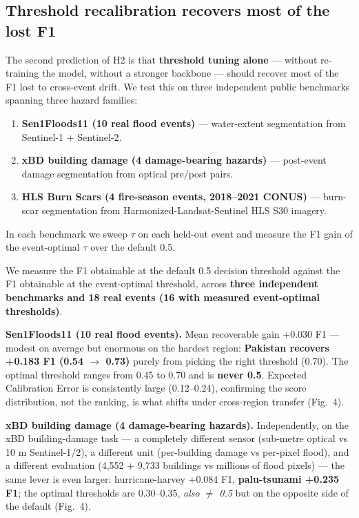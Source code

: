 \documentclass[sn-nature,lineno]{sn-jnl}
\providecommand{\tightlist}{\setlength{\itemsep}{0pt}\setlength{\parskip}{0pt}}
\theoremstyle{thmstyleone}
\theoremstyle{thmstyletwo}
\theoremstyle{thmstylethree}
\begin{document}
\subsection{Threshold recalibration recovers most of the lost F1}\label{threshold-recalibration-recovers-most-of-the-lost-f1}

The second prediction of H2 is that \textbf{threshold tuning alone} --- without
re-training the model, without a stronger backbone --- should recover most
of the F1 lost to cross-event drift. We test this on three independent
public benchmarks spanning three hazard families:

\begin{enumerate}
\def\labelenumi{\arabic{enumi}.}
\tightlist
\item
  \textbf{Sen1Floods11 (10 real flood events)} --- water-extent segmentation
  from Sentinel-1 + Sentinel-2.
\item
  \textbf{xBD building damage (4 damage-bearing hazards)} --- post-event
  damage segmentation from optical pre/post pairs.
\item
  \textbf{HLS Burn Scars (4 fire-season events, 2018--2021 CONUS)} --- burn-
  scar segmentation from Harmonized-Landsat-Sentinel HLS S30 imagery.
\end{enumerate}

In each benchmark we sweep $\tau$ on each held-out event and measure the F1
gain of the event-optimal $\tau$ over the default 0.5.

We measure the F1 obtainable at the default 0.5 decision threshold against
the F1 obtainable at the event-optimal threshold, across \textbf{three independent
benchmarks and 18 real events (16 with measured event-optimal thresholds)}.

\textbf{Sen1Floods11 (10 real flood events).} Mean recoverable gain +0.030 F1 ---
modest on average but enormous on the hardest region: \textbf{Pakistan recovers
+0.183 F1 (0.54 $\rightarrow$ 0.73)} purely from picking the right threshold (0.70).
The optimal threshold ranges from 0.45 to 0.70 and is \textbf{never 0.5}.
Expected Calibration Error is consistently large (0.12--0.24), confirming the
score distribution, not the ranking, is what shifts under cross-region
transfer (Fig.~4).

\textbf{xBD building damage (4 damage-bearing hazards).} Independently, on the
xBD building-damage task --- a completely different sensor (sub-metre optical
vs 10 m Sentinel-1/2), a different unit (per-building damage vs per-pixel
flood), and a different evaluation (4,552 + 9,733 buildings vs millions of
flood pixels) --- the same lever is even larger: hurricane-harvey +0.084 F1,
\textbf{palu-tsunami +0.235 F1}; the optimal thresholds are 0.30--0.35, \emph{also
$\neq$ 0.5} but on the opposite side of the default (Fig.~4).
\end{document}
